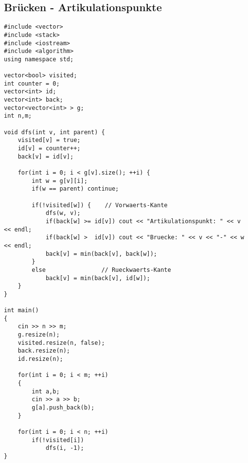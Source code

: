 \subsection{Brücken - Artikulationspunkte}
\begin{lstlisting}
#include <vector>
#include <stack>
#include <iostream>
#include <algorithm>
using namespace std;

vector<bool> visited;
int counter = 0;
vector<int> id;
vector<int> back;
vector<vector<int> > g;
int n,m;

void dfs(int v, int parent) {
    visited[v] = true;
    id[v] = counter++;
    back[v] = id[v];

    for(int i = 0; i < g[v].size(); ++i) {
        int w = g[v][i];
        if(w == parent) continue;

        if(!visited[w]) {    // Vorwaerts-Kante
            dfs(w, v);
            if(back[w] >= id[v]) cout << "Artikulationspunkt: " << v << endl;
            if(back[w] >  id[v]) cout << "Bruecke: " << v << "-" << w << endl;
            back[v] = min(back[v], back[w]);
        }
        else                // Rueckwaerts-Kante
            back[v] = min(back[v], id[w]);
    }
}

int main()
{
	cin >> n >> m;
	g.resize(n);
	visited.resize(n, false);
	back.resize(n);
	id.resize(n);
	
	for(int i = 0; i < m; ++i)
	{
		int a,b;
		cin >> a >> b;
		g[a].push_back(b);
	}
	
	for(int i = 0; i < n; ++i)
		if(!visited[i])
			dfs(i, -1);
}  
\end{lstlisting}
